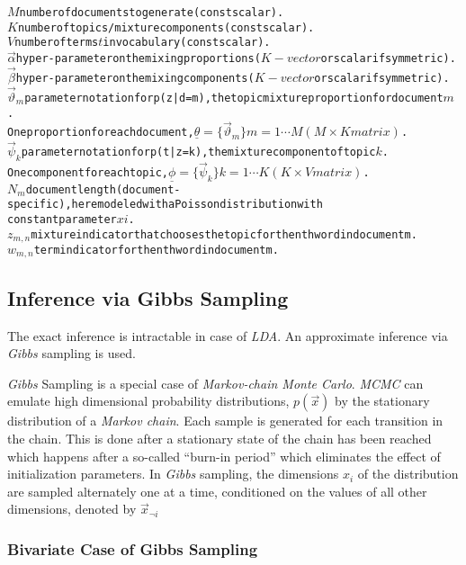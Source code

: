 \begin{alltt}
\(M\) number of documents to generate (const scalar).
\(K\) number of topics/mixture components (const scalar).
\(V\) number of terms \(t\) in vocabulary (const scalar).
\(\vec{\alpha}\) hyper-parameter on the mixing proportions (\(K-vector\) or scalar if symmetric).
\(\vec{\beta}\) hyper-parameter on the mixing components (\(K-vector\) or scalar if symmetric).
\(\vec{\vartheta}_m\) parameter notation for p(z|d=m), the topic mixture proportion for document \(m\). 
  One proportion for each document, \(\underline{\theta} = \{\vec{\vartheta}_m\} m=1 \cdots M (M \times K matrix)\).
\(\vec{\psi}_k\) parameter notation for p(t|z=k), the mixture component of topic \(k\). 
  One component for each topic, \(\underline{\phi} = \{\vec{\psi}_k\} k=1 \cdots K (K \times V matrix)\).
\(N_m\) document length (document-specific), here modeled with a Poisson distribution with 
  constant parameter \(xi\).
\(z_{m,n}\) mixture indicator that chooses the topic for the nth word in document m.
\(w_{m,n}\) term indicator for the nth word in document m.
\end{alltt}

\subsection{Inference via Gibbs Sampling}

The exact inference is intractable in case of \textit{LDA}. An approximate inference via \textit{Gibbs} sampling is used. 

\par
\textit{Gibbs} Sampling \citep*{walsh2004markov} is a special case of \textit{Markov-chain Monte Carlo}. \textit{MCMC} can emulate high dimensional probability
distributions, \(p(\vec{x})\) by the stationary distribution of a \textit{Markov chain}. Each sample is generated for each transition in 
the chain. This is done after a stationary state of the chain has been reached which happens after a so-called ``burn-in period'' which 
eliminates the effect of initialization parameters. In \textit{Gibbs} sampling, the dimensions \(x_i\) of the distribution are sampled
alternately one at a time, conditioned on the values of all other dimensions, denoted by \(\vec{x}_{ \neg i}\)

\subsubsection*{Bivariate Case of Gibbs Sampling}

